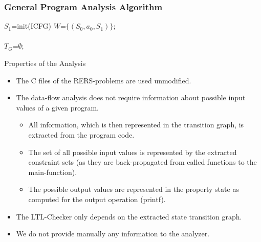 \begin{frame}[fragile]
\frametitle{General Program Analysis Algorithm}
{
\scriptsize
\begin{algorithm}[H]
\SetLine
{}


$S_1$=init(ICFG) 
$W$=$\{(S_0,a_0,S_1)\}$; \\
\\
$T_G$=$\emptyset$; \\
\label{alg:general}
\end{algorithm}
}
\end{frame}

\begin{frame}{Properties of the Analysis}
\begin{itemize}
\item The C files of the RERS-problems are used unmodified.
\item The data-flow analysis does not require information about possible input values of a
  given program. 
\begin{itemize}
\item All information, which is then represented in the
  transition graph, is extracted from the program code. 

\item The set of all
  possible input values is represented by the extracted constraint
  sets (as they are back-propagated from called functions to the
  main-function). 
\item The possible output values are represented in the
  property state as computed for the output operation (printf).
\end{itemize}
\item The LTL-Checker only depends on the extracted state transition graph.
\item We do not provide manually any information to the analyzer.
\end{itemize}

\end{frame}

